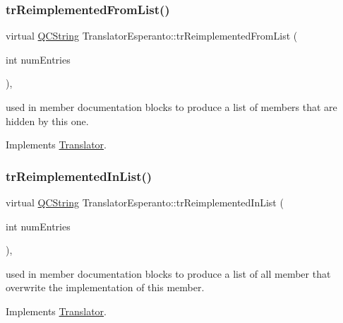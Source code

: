 \subsubsection{\texorpdfstring{trReimplementedFromList()}{trReimplementedFromList()}}
{\footnotesize\ttfamily virtual \mbox{\hyperlink{class_q_c_string}{Q\+C\+String}} Translator\+Esperanto\+::tr\+Reimplemented\+From\+List (\begin{DoxyParamCaption}\item[{int}]{num\+Entries }\end{DoxyParamCaption})\hspace{0.3cm}{\ttfamily [inline]}, {\ttfamily [virtual]}}

used in member documentation blocks to produce a list of members that are hidden by this one. 

Implements \mbox{\hyperlink{class_translator}{Translator}}.

\mbox{\label{class_translator_esperanto_a018d967a3005fb2a9f2d7e3bc2d774f3}} 
\subsubsection{\texorpdfstring{trReimplementedInList()}{trReimplementedInList()}}
{\footnotesize\ttfamily virtual \mbox{\hyperlink{class_q_c_string}{Q\+C\+String}} Translator\+Esperanto\+::tr\+Reimplemented\+In\+List (\begin{DoxyParamCaption}\item[{int}]{num\+Entries }\end{DoxyParamCaption})\hspace{0.3cm}{\ttfamily [inline]}, {\ttfamily [virtual]}}

used in member documentation blocks to produce a list of all member that overwrite the implementation of this member. 

Implements \mbox{\hyperlink{class_translator}{Translator}}.

\mbox{\label{class_translator_esperanto_affe0b146565b051bfbb81ecb248e32f7}} 
